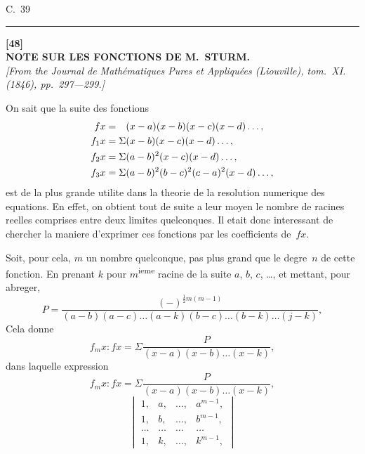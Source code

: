 \documentclass[11pt,a4paper]{book}
\begin{document}
\begin{center}
C.~39
\end{center}

\vspace{20pt}
\begin{center}
\rule{0.5\textwidth}{0.4pt}
\end{center}


\newpage
\begin{center}
\textbf{[48]}\\[4pt]
\textbf{\large NOTE SUR LES FONCTIONS DE M.\ STURM.}\\[4pt]
\textit{[From the Journal de Math\'ematiques Pures et Appliqu\'ees (Liouville), tom.~XI. (1846), pp.~297---299.]}
\end{center}

\vspace{6pt}

On sait que la suite des fonctions
\begin{align*}
fx &= \hphantom{\Sigma}(x-a)(x-b)(x-c)(x-d)\ldots,\\
f_1x &= \Sigma(x-b)(x-c)(x-d)\ldots,\\
f_2x &= \Sigma(a-b)^2(x-c)(x-d)\ldots,\\
f_3x &= \Sigma(a-b)^2(b-c)^2(c-a)^2(x-d)\ldots,
\end{align*}
est de la plus grande utilite dans la theorie de la resolution numerique des equations. En effet, on obtient tout de suite a leur moyen le nombre de racines reelles comprises entre deux limites quelconques. Il etait donc interessant de chercher la maniere d'exprimer ces fonctions par les coefficients de~$fx$.

Soit, pour cela, $m$ un nombre quelconque, pas plus grand que le degre~$n$ de cette fonction. En prenant $k$ pour $m$\textsuperscript{ieme} racine de la suite $a$, $b$, $c$, \ldots, et mettant, pour abreger,
\[
P = \frac{(-)^{\frac{1}{2}m(m-1)}}{(a-b)(a-c)\ldots(a-k)(b-c)\ldots(b-k)\ldots(j-k)},
\]
Cela donne
\[
f_m x : fx = \Sigma \frac{P}{(x-a)(x-b)\ldots(x-k)},
\]
dans laquelle expression
\[
f_m x : fx = \Sigma \frac{P}{(x-a)(x-b)\ldots(x-k)},
\]
\[
\begin{vmatrix}
1, & a, & \ldots, & a^{m-1},\\
1, & b, & \ldots, & b^{m-1},\\
\ldots & \ldots & \ldots & \ldots\\
1, & k, & \ldots, & k^{m-1},
\end{vmatrix}
\]
\end{document}

